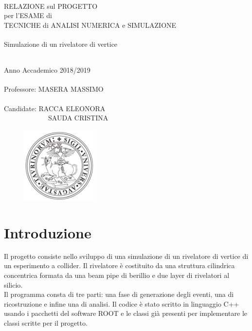 \documentclass[11pt,a4paper]{article}
\begin{document}
\thispagestyle{empty}

\rmfamily
\begin{center}
\ \\
\vspace{2cm}

\LARGE{\textcolor[rgb]{1,0,0}{RELAZIONE sul PROGETTO\\ per l'ESAME di\\TECNICHE di ANALISI NUMERICA e SIMULAZIONE}\\}
\huge{\textcolor[rgb]{1,0,0}{\ \\Simulazione di un rivelatore di vertice}\\}
\hrulefill \\
\vspace{1.5cm}

\Large{Anno Accademico 2018/2019
\\ \ \\
Professore: MASERA MASSIMO
\\ \ \\ 
Candidate: RACCA ELEONORA\\
\ \ \ \ \ \ \ \ \ \ \ \ \ SAUDA CRISTINA}

\vspace{6cm}
\begin{figure}[h]
\centering
	\includegraphics[width=0.35\textwidth]{Immagini/logounito.pdf}
\end{figure}

\end{center}

\section{Introduzione}
\par Il progetto consiste nello sviluppo di una simulazione di un rivelatore di vertice di un esperimento a collider. Il rivelatore è costituito da una struttura cilindrica concentrica formata da una beam pipe di berillio e due layer di rivelatori al silicio.\\
Il programma consta di tre parti: una fase di generazione degli eventi, una di ricostruzione e infine una di analisi.
Il codice è stato scritto in linguaggio C++ usando i pacchetti del software ROOT e le classi già presenti per implementare le classi scritte per il progetto.
\end{document}

